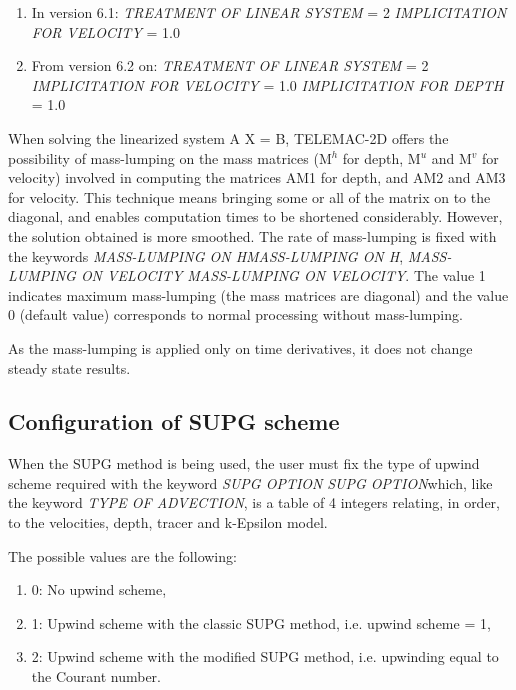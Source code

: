 \begin{enumerate}
\item  In version 6.1: \textit{TREATMENT OF LINEAR SYSTEM} = 2 \textit{IMPLICITATION FOR VELOCITY} = 1.0

\item  From version 6.2 on: \textit{TREATMENT OF LINEAR SYSTEM} = 2 \textit{IMPLICITATION FOR VELOCITY} = 1.0 \textit{IMPLICITATION FOR DEPTH} = 1.0
\end{enumerate}

 When solving the linearized system A X = B, TELEMAC-2D offers the possibility of mass-lumping on the mass matrices (M${}^{h}$ for depth, M${}^{u}$ and M${}^{v}$ for velocity) involved in computing the matrices AM1 for depth, and AM2 and AM3 for velocity. This technique means bringing some or all of the matrix on to the diagonal, and enables computation times to be shortened considerably. However, the solution obtained is more smoothed. The rate of mass-lumping is fixed with the keywords \textit{MASS-LUMPING ON HMASS-LUMPING ON H}, \textit{MASS-LUMPING ON VELOCITY MASS-LUMPING ON VELOCITY}. The value 1 indicates maximum mass-lumping (the mass matrices are diagonal) and the value 0 (default value) corresponds to normal processing without mass-lumping.

 As the mass-lumping is applied only on time derivatives, it does not change steady state results.


\subsection{  Configuration of SUPG scheme}

 When the SUPG method is being used, the user must fix the type of upwind scheme required with the keyword \textit{SUPG OPTION} \textit{SUPG OPTION}which, like the keyword \textit{TYPE OF ADVECTION}, is a table of 4 integers relating, in order, to the velocities, depth, tracer and k-Epsilon model.

 The possible values are the following:

\begin{enumerate}
\item[\nonumber]   0: No upwind scheme,

\item [\nonumber]  1: Upwind scheme with the classic SUPG method, i.e. upwind scheme = 1,

\item[\nonumber]   2: Upwind scheme with the modified SUPG method, i.e. upwinding equal to the Courant number.
\end{enumerate}

